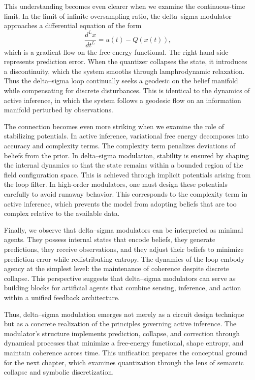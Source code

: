 This understanding becomes even clearer when we examine the continuous-time limit. In the limit of infinite oversampling ratio, the delta–sigma modulator approaches a differential equation of the form
\[
\frac{d^{L} x}{dt^{L}} = u(t) - Q(x(t)),
\]
which is a gradient flow on the free-energy functional. The right-hand side represents prediction error. When the quantizer collapses the state, it introduces a discontinuity, which the system smooths through lamphrodynamic relaxation. Thus the delta–sigma loop continually seeks a geodesic on the belief manifold while compensating for discrete disturbances. This is identical to the dynamics of active inference, in which the system follows a geodesic flow on an information manifold perturbed by observations.

The connection becomes even more striking when we examine the role of stabilizing potentials. In active inference, variational free energy decomposes into accuracy and complexity terms. The complexity term penalizes deviations of beliefs from the prior. In delta–sigma modulation, stability is ensured by shaping the internal dynamics so that the state remains within a bounded region of the field configuration space. This is achieved through implicit potentials arising from the loop filter. In high-order modulators, one must design these potentials carefully to avoid runaway behavior. This corresponds to the complexity term in active inference, which prevents the model from adopting beliefs that are too complex relative to the available data.

Finally, we observe that delta–sigma modulators can be interpreted as minimal agents. They possess internal states that encode beliefs, they generate predictions, they receive observations, and they adjust their beliefs to minimize prediction error while redistributing entropy. The dynamics of the loop embody agency at the simplest level: the maintenance of coherence despite discrete collapse. This perspective suggests that delta–sigma modulators can serve as building blocks for artificial agents that combine sensing, inference, and action within a unified feedback architecture.

Thus, delta–sigma modulation emerges not merely as a circuit design technique but as a concrete realization of the principles governing active inference. The modulator’s structure implements prediction, collapse, and correction through dynamical processes that minimize a free-energy functional, shape entropy, and maintain coherence across time. This unification prepares the conceptual ground for the next chapter, which examines quantization through the lens of semantic collapse and symbolic discretization.



